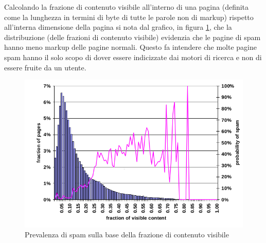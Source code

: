Calcolando la frazione di contenuto visibile all'interno di una pagina (definita come la lunghezza in termini di byte di tutte le parole non di markup) rispetto all'interna dimensione della pagina si nota dal grafico, in figura \ref{fig:fetterly7}, che la distribuzione (delle frazioni di contenuto visibile) evidenzia che le pagine di spam hanno meno markup delle pagine normali. Questo fa intendere che molte pagine spam hanno il solo scopo di dover essere indicizzate dai motori di ricerca  e non di essere fruite da un utente.
\begin{figure}[htbp]
\centering
\includegraphics[width=12cm]{immagini/fetterly/fetterly7}
\caption{Prevalenza di spam sulla base della frazione di contenuto visibile}
\label{fig:fetterly7}
\end{figure}

